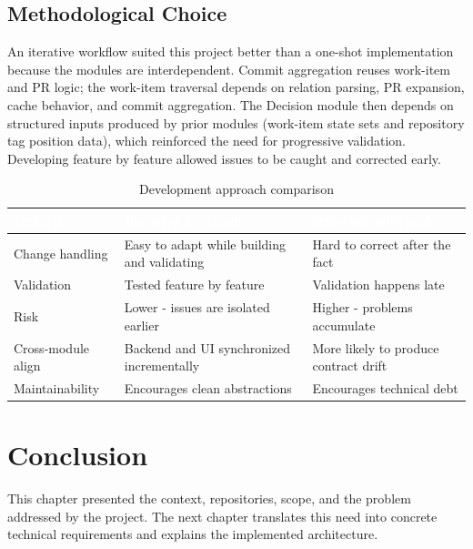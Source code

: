\documentclass[12pt,a4paper]{report}
\begin{document}
\subsection{Methodological Choice}

An iterative workflow suited this project better than a one-shot implementation
because the modules are interdependent. Commit aggregation reuses work-item and
PR logic; the work-item traversal depends on relation parsing, PR expansion, cache
behavior, and commit aggregation. The Decision module then depends on structured
inputs produced by prior modules (work-item state sets and repository tag
position data), which reinforced the need for progressive validation. Developing
feature by feature allowed issues to be caught and corrected early.

\begin{table}[H]
\centering
\caption{Development approach comparison}
\label{tab:dev-approach}
\begin{tabular}{|p{3.2cm}|p{5.6cm}|p{5.6cm}|}
\hline
\rowcolor{primary}
  \textcolor{white}{\textbf{Criteria}} &
  \textcolor{white}{\textbf{Iterative approach}} &
  \textcolor{white}{\textbf{One-shot approach}} \\
\hline
Change handling    & Easy to adapt while building and validating         & Hard to correct after the fact \\
Validation         & Tested feature by feature                           & Validation happens late \\
Risk               & Lower - issues are isolated earlier                 & Higher - problems accumulate \\
Cross-module align & Backend and UI synchronized incrementally           & More likely to produce contract drift \\
Maintainability    & Encourages clean abstractions                       & Encourages technical debt \\
\hline
\end{tabular}
\end{table}

\section{Conclusion}

This chapter presented the context, repositories, scope, and the problem addressed
by the project. The next chapter translates this need into concrete technical
requirements and explains the implemented architecture.
\end{document}
